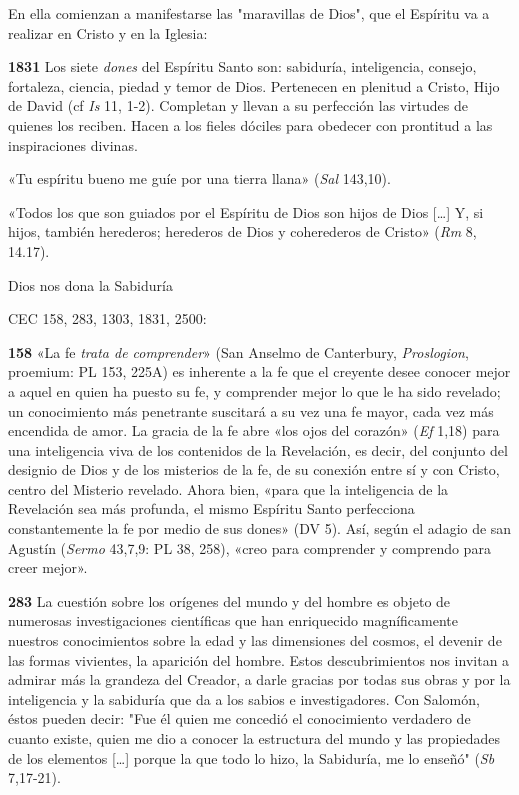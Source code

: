 \documentclass[]{article}
\begin{document}
En ella comienzan a manifestarse las "maravillas de Dios", que el
Espíritu va a realizar en Cristo y en la Iglesia:

\textbf{1831} Los siete \emph{dones} del Espíritu Santo son: sabiduría,
inteligencia, consejo, fortaleza, ciencia, piedad y temor de Dios.
Pertenecen en plenitud a Cristo, Hijo de David (cf \emph{Is} 11, 1-2).
Completan y llevan a su perfección las virtudes de quienes los reciben.
Hacen a los fieles dóciles para obedecer con prontitud a las
inspiraciones divinas.

«Tu espíritu bueno me guíe por una tierra llana» (\emph{Sal} 143,10).

«Todos los que son guiados por el Espíritu de Dios son hijos de Dios
[\ldots{}] Y, si hijos, también herederos; herederos de Dios y
coherederos de Cristo» (\emph{Rm} 8, 14.17).

Dios nos dona la Sabiduría

CEC 158, 283, 1303, 1831, 2500:

\textbf{158} «La fe \emph{trata de comprender}» (San Anselmo de
Canterbury, \emph{Proslogion}, proemium: PL 153, 225A) es inherente a la
fe que el creyente desee conocer mejor a aquel en quien ha puesto su fe,
y comprender mejor lo que le ha sido revelado; un conocimiento más
penetrante suscitará a su vez una fe mayor, cada vez más encendida de
amor. La gracia de la fe abre «los ojos del corazón» (\emph{Ef} 1,18)
para una inteligencia viva de los contenidos de la Revelación, es decir,
del conjunto del designio de Dios y de los misterios de la fe, de su
conexión entre sí y con Cristo, centro del Misterio revelado. Ahora
bien, «para que la inteligencia de la Revelación sea más profunda, el
mismo Espíritu Santo perfecciona constantemente la fe por medio de sus
dones» (DV 5). Así, según el adagio de san Agustín (\emph{Sermo} 43,7,9:
PL 38, 258), «creo para comprender y comprendo para creer mejor».

\textbf{283} La cuestión sobre los orígenes del mundo y del hombre es
objeto de numerosas investigaciones científicas que han enriquecido
magníficamente nuestros conocimientos sobre la edad y las dimensiones
del cosmos, el devenir de las formas vivientes, la aparición del hombre.
Estos descubrimientos nos invitan a admirar más la grandeza del Creador,
a darle gracias por todas sus obras y por la inteligencia y la sabiduría
que da a los sabios e investigadores. Con Salomón, éstos pueden decir:
"Fue él quien me concedió el conocimiento verdadero de cuanto existe,
quien me dio a conocer la estructura del mundo y las propiedades de los
elementos [\ldots{}] porque la que todo lo hizo, la Sabiduría, me lo
enseñó" (\emph{Sb} 7,17-21).
\end{document}
